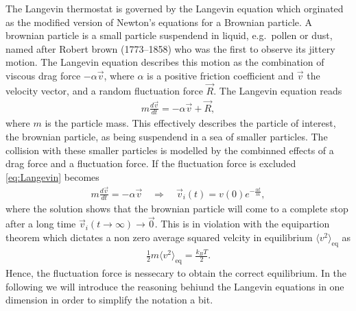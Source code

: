 The Langevin thermostat is governed by the Langevin equation which orginated as the modified version of Newton's equations for a
Brownian particle. A brownian particle is a small particle suspendend in liquid,
e.g.\ pollen or dust, named after Robert brown (1773–1858) who was the first to
observe its jittery motion. The Langevin equation describes this motion as the
combination of viscous drag force $ -\alpha \vec{v}$, where $\alpha$ is a
positive friction coefficient and $\vec{v}$ the velocity vector, and a random
fluctuation force $\vec{R}$. The Langevin equation reads
\begin{align}
  m \frac{d \vec{v}}{dt} = -\alpha \vec{v} + \vec{R},
  \label{eq:Langevin}
\end{align}
where $m$ is the particle mass. This effectively describes the particle of
interest, the brownian particle, as being suspendend in a sea of smaller
particles. The collision with these smaller particles is modelled by the combinned effects of a drag force and a fluctuation force. If the fluctuation force is excluded \cref{eq:Langevin} becomes 
\begin{align*}
  m \frac{d \vec{v}}{dt} = -\alpha \vec{v} \quad \Rightarrow \quad 
  \vec{v}_i(t) = v(0)e^{- \frac{\alpha t}{m}},
\end{align*}
where the solution shows that the brownian particle will come to a complete stop
after a long time ${\vec{v}_i(t\to\infty) \to \vec{0}}$. This is in violation
with the equipartion theorem which dictates a non zero average squared velcity in equilibrium $\langle v^2 \rangle_{\text{eq}}$ as
\begin{align}
  \frac{1}{2}m\langle v^2 \rangle_{\text{eq}} = \frac{k_B T}{2}.
  \label{eq:equipartion}
\end{align}
Hence, the fluctuation force is nessecary to obtain the correct equilibrium. In the following we will introduce the reasoning behiund the Langevin equations in one dimension in order to simplify the notation a bit.

